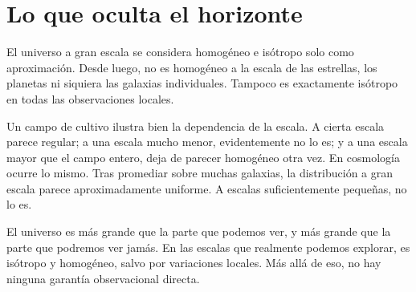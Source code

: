 \begin{classroomqa}\end{classroomqa}

\section{Lo que oculta el horizonte}

El universo a gran escala se considera homogéneo e isótropo solo como aproximación. Desde luego, no es homogéneo a la escala de las estrellas, los planetas ni siquiera las galaxias individuales. Tampoco es exactamente isótropo en todas las observaciones locales.

Un campo de cultivo ilustra bien la dependencia de la escala. A cierta escala parece regular; a una escala mucho menor, evidentemente no lo es; y a una escala mayor que el campo entero, deja de parecer homogéneo otra vez. En cosmología ocurre lo mismo. Tras promediar sobre muchas galaxias, la distribución a gran escala parece aproximadamente uniforme. A escalas suficientemente pequeñas, no lo es.

El universo es más grande que la parte que podemos ver, y más grande que la parte que podremos ver jamás. En las escalas que realmente podemos explorar, es isótropo y homogéneo, salvo por variaciones locales. Más allá de eso, no hay ninguna garantía observacional directa.

\begin{classroomqa}\end{classroomqa}

